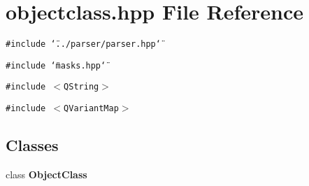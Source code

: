 \section{objectclass.hpp File Reference}
\label{objectclass_8hpp}
{\tt \#include \char`\"{}../parser/parser.hpp\char`\"{}}\par
{\tt \#include \char`\"{}masks.hpp\char`\"{}}\par
{\tt \#include $<$QString$>$}\par
{\tt \#include $<$QVariant\-Map$>$}\par
\subsection*{Classes}
\begin{CompactItemize}
\item 
class {\bf Object\-Class}
\end{CompactItemize}
